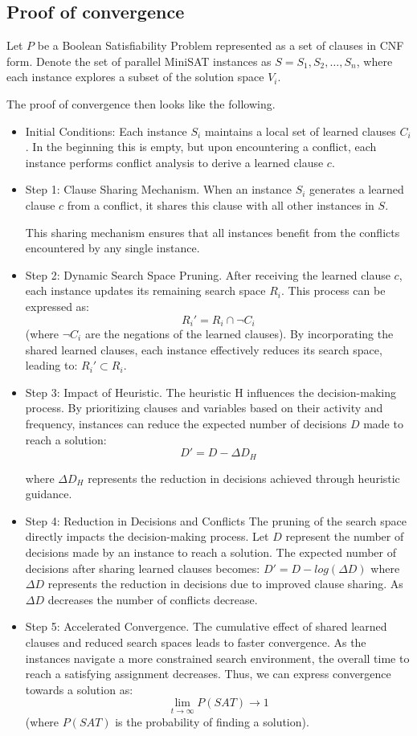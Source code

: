\documentclass{article}
\begin{document}
\subsection{Proof of convergence}

Let $P$ be a Boolean Satisfiability Problem represented as a set of clauses in CNF form. Denote the set of parallel MiniSAT instances as $S={S_1,S_2,…,S_n}$, where each instance explores a subset of the solution space $V_i$.

The proof of convergence then looks like the following.
\begin{itemize}
    \item Initial Conditions: Each instance $S_i$ maintains a local set of learned clauses $C_i$. In the beginning this is empty, but upon encountering a conflict, each instance performs conflict analysis to derive a learned clause $c$.
    \item Step 1: Clause Sharing Mechanism. When an instance $S_i$ generates a learned clause $c$ from a conflict, it shares this clause with all other instances in $S$. %

    This sharing mechanism ensures that all instances benefit from the conflicts encountered by any single instance.
    \item Step 2: Dynamic Search Space Pruning. After receiving the learned clause $c$, each instance updates its remaining search space $R_i$. This process can be expressed as: $$R_i' = R_i \cap \neg C_i$$ (where $\neg C_i$ are the negations of the learned clauses). By incorporating the shared learned clauses, each instance effectively reduces its search space, leading to: $R_i' \subset R_i$.
    \item  Step 3: Impact of Heuristic. The heuristic H influences the decision-making process. By prioritizing clauses and variables based on their activity and frequency, instances can reduce the expected number of decisions $D$ made to reach a solution:
    $$D' = D - \Delta D_H$$

    where $\Delta D_H$ represents the reduction in decisions achieved through heuristic guidance.
    \item Step 4: Reduction in Decisions and Conflicts
    The pruning of the search space directly impacts the decision-making process. Let $D$ represent the number of decisions made by an instance to reach a solution. The expected number of decisions after sharing learned clauses becomes: $D'=D - log(\Delta D)$
    where $\Delta D$ represents the reduction in decisions due to improved clause sharing. As $\Delta D$ decreases the number of conflicts decrease.

    \item Step 5: Accelerated Convergence. The cumulative effect of shared learned clauses and reduced search spaces leads to faster convergence. As the instances navigate a more constrained search environment, the overall time to reach a satisfying assignment decreases. Thus, we can express convergence towards a solution as: $$ \lim_{t \rightarrow \infty}P(SAT) \rightarrow 1 $$ (where $P(SAT)$ is the probability of finding a solution).
\end{itemize}
\end{document}
